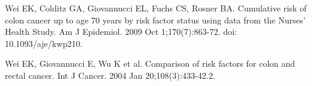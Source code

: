 \documentclass{article}
\begin{document}
\begin{thebibliography}{1}
Wei EK, Colditz GA, Giovannucci EL, Fuchs CS, Rosner BA. Cumulative risk of colon cancer up to age 70 years by risk factor status using data from the Nurses’ Health Study. Am J Epidemiol. 2009 Oct 1;170(7):863-72. doi: 10.1093/aje/kwp210.

Wei EK, Giovannucci E, Wu K et al. Comparison of risk factors for colon and rectal cancer. Int J Cancer. 2004 Jan 20;108(3):433-42.2.




\end{thebibliography}
\end{document}
